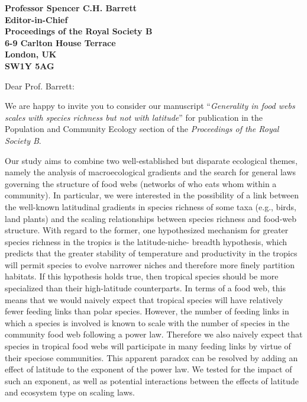 \documentclass[12pt]{letter}
\newcommand{\mytitle}{\emph{Generality in food webs scales with species richness but not with latitude}}
\newcommand{\myjournal}{\emph{Proceedings of the Royal Society B}}
\begin{document}
\begin{letter}{\bf Professor Spencer C.H. Barrett\\
               Editor-in-Chief\\
               Proceedings of the Royal Society B\\
               6-9 Carlton House Terrace\\
               London, UK\\
               SW1Y 5AG\\
                }

\opening{Dear Prof. Barrett:}

We are happy to invite you to consider our manuscript 
``\mytitle'' for publication in the Population and Community Ecology section of the \emph{\myjournal}. 

Our study aims to combine two well-established but disparate ecological
themes, namely the analysis of macroecological gradients and the search for
general laws governing the structure of food webs (networks of who eats whom
within a community). In particular, we were interested in the possibility of a
link between the well-known latitudinal gradients in species richness of some
taxa (e.g., birds, land plants) and the scaling relationships between species
richness and food-web structure. With regard to the former, one  hypothesized
mechanism for greater species richness in the tropics is the latitude-niche-
breadth hypothesis, which predicts that the greater stability of temperature
and productivity in the tropics will permit species to evolve narrower niches
and therefore more finely partition habitats. If this hypothesis holds true,
then tropical species should be more specialized than their high-latitude
counterparts. In terms of a food web, this means that we would naively expect
that tropical species will have relatively fewer feeding links than polar
species. However, the number of feeding links in which a species is involved
is known to scale with the number of species in the community food web
following a power law. Therefore we also naively expect that species in
tropical food webs will participate in many feeding links by virtue of their
speciose communities. This apparent paradox can be resolved by adding an
effect of latitude to the exponent of the power law. We tested for the impact
of such an exponent, as well as potential interactions between the effects of
latitude and ecosystem type on scaling laws.



\end{letter}
\end{document}
